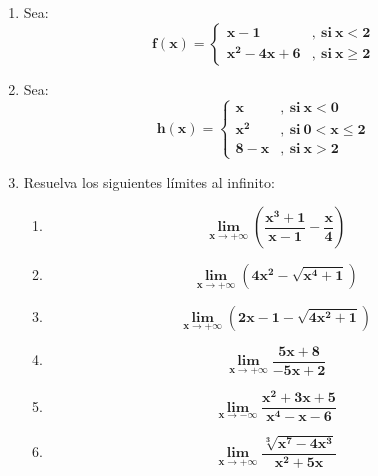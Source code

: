 \documentclass[12pt]{article}
\begin{document}
\begin{enumerate}
            \item Sea: 
                \[
                    \boldsymbol{
                        f(x) = 
                        \left\{
                            \begin{array}{ll}
                                x - 1 & ,\ \text{si} \ x < 2 \\
                                x ^2 - 4x + 6 & ,\ \text{si} \ x \geq 2
                            \end{array}
                        \right.
                    }
                \]

            \item Sea: 
                \[
                    \boldsymbol{
                        h(x) = 
                        \left\{
                            \begin{array}{ll}
                                x & ,\ \text{si} \ x < 0 \\
                                x ^2 & ,\ \text{si} \ 0 < x \leq 2 \\
                                8 - x & ,\ \text{si} \ x > 2
                            \end{array}
                        \right.
                    }
                \]
            
            
            \item Resuelva los siguientes límites al infinito:
                \begin{enumerate}[label=\textbf{\arabic*)}] 
                    \item \[\bm{\lim_{x \to +\infty} \left( \frac{x^3 + 1}{x - 1} - \frac{x}{4} \right)}\]
                    \item \[\bm{\lim_{x \to +\infty} \left( 4x^2 - \sqrt{x^4 + 1} \right)}\]
                    \item \[\bm{\lim_{x \to +\infty} \left( 2x - 1 - \sqrt{4x^2 + 1} \right)}\]
                    \item \[\bm{\lim_{x \to +\infty} \frac{5x + 8}{-5x + 2}}\]
                    \item \[\bm{\lim_{x \to -\infty} \frac{x^2 + 3x + 5}{x^4 - x - 6}}\]
                    \item \[\bm{\lim_{x \to +\infty} \frac{\sqrt[3]{x^7 - 4x^3}}{x^2 + 5x}}\]
                \end{enumerate}

        
        \end{enumerate}
\end{document}
